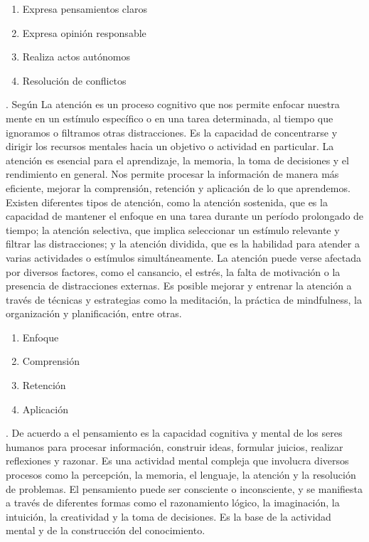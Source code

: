 \documentclass[12pt,a4paper]{article}
\begin{document}
\begin{enumerate}
	\item Expresa pensamientos claros
	\item Expresa opinión responsable
	\item Realiza actos autónomos
	\item Resolución de conflictos
\end{enumerate}
\noindent\textbf{\dimddd}. Según \cite{plaza_inteligencia_2015}	La atención es un proceso cognitivo que nos permite enfocar nuestra mente en un estímulo específico o en una tarea determinada, al tiempo que ignoramos o filtramos otras distracciones. Es la capacidad de concentrarse y dirigir los recursos mentales hacia un objetivo o actividad en particular.
La atención es esencial para el aprendizaje, la memoria, la toma de decisiones y el rendimiento en general. Nos permite procesar la información de manera más eficiente, mejorar la comprensión, retención y aplicación de lo que aprendemos.
Existen diferentes tipos de atención, como la atención sostenida, que es la capacidad de mantener el enfoque en una tarea durante un período prolongado de tiempo; la atención selectiva, que implica seleccionar un estímulo relevante y filtrar las distracciones; y la atención dividida, que es la habilidad para atender a varias actividades o estímulos simultáneamente.
La atención puede verse afectada por diversos factores, como el cansancio, el estrés, la falta de motivación o la presencia de distracciones externas. Es posible mejorar y entrenar la atención a través de técnicas y estrategias como la meditación, la práctica de mindfulness, la organización y planificación, entre otras.

\begin{enumerate}
	\item Enfoque
	\item Comprensión
	\item Retención
	\item Aplicación
\end{enumerate}

\noindent\textbf{\dimdddd}. De acuerdo a \cite{canas_comunicacion_2019} el pensamiento es la capacidad cognitiva y mental de los seres humanos para procesar información, construir ideas, formular juicios, realizar reflexiones y razonar. Es una actividad mental compleja que involucra diversos procesos como la percepción, la memoria, el lenguaje, la atención y la resolución de problemas. El pensamiento puede ser consciente o inconsciente, y se manifiesta a través de diferentes formas como el razonamiento lógico, la imaginación, la intuición, la creatividad y la toma de decisiones. Es la base de la actividad mental y de la construcción del conocimiento.
\end{document}
